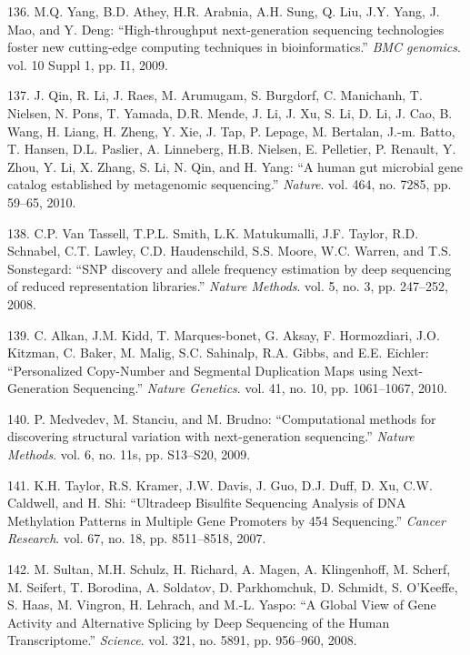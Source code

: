 \documentclass[12pt,a4paper,twoside]{ugathesis}
\theoremstyle{definition}
\theoremstyle{definition}
\theoremstyle{definition}
\theoremstyle{remark}
\begin{document}
\hypertarget{ref-Yang2009}{}
136. M.Q. Yang, B.D. Athey, H.R. Arabnia, A.H. Sung, Q. Liu, J.Y. Yang,
J. Mao, and Y. Deng: ``High-throughput next-generation sequencing
technologies foster new cutting-edge computing techniques in
bioinformatics.'' \emph{BMC genomics}. vol. 10 Suppl 1, pp. I1, 2009.

\hypertarget{ref-Qin2010}{}
137. J. Qin, R. Li, J. Raes, M. Arumugam, S. Burgdorf, C. Manichanh, T.
Nielsen, N. Pons, T. Yamada, D.R. Mende, J. Li, J. Xu, S. Li, D. Li, J.
Cao, B. Wang, H. Liang, H. Zheng, Y. Xie, J. Tap, P. Lepage, M.
Bertalan, J.-m. Batto, T. Hansen, D.L. Paslier, A. Linneberg, H.B.
Nielsen, E. Pelletier, P. Renault, Y. Zhou, Y. Li, X. Zhang, S. Li, N.
Qin, and H. Yang: ``A human gut microbial gene catalog established by
metagenomic sequencing.'' \emph{Nature}. vol. 464, no. 7285, pp. 59--65,
2010.

\hypertarget{ref-VanTassell2008}{}
138. C.P. Van Tassell, T.P.L. Smith, L.K. Matukumalli, J.F. Taylor, R.D.
Schnabel, C.T. Lawley, C.D. Haudenschild, S.S. Moore, W.C. Warren, and
T.S. Sonstegard: ``SNP discovery and allele frequency estimation by deep
sequencing of reduced representation libraries.'' \emph{Nature Methods}.
vol. 5, no. 3, pp. 247--252, 2008.

\hypertarget{ref-Alkan2010}{}
139. C. Alkan, J.M. Kidd, T. Marques-bonet, G. Aksay, F. Hormozdiari,
J.O. Kitzman, C. Baker, M. Malig, S.C. Sahinalp, R.A. Gibbs, and E.E.
Eichler: ``Personalized Copy-Number and Segmental Duplication Maps using
Next-Generation Sequencing.'' \emph{Nature Genetics}. vol. 41, no. 10,
pp. 1061--1067, 2010.

\hypertarget{ref-Medvedev2009}{}
140. P. Medvedev, M. Stanciu, and M. Brudno: ``Computational methods for
discovering structural variation with next-generation sequencing.''
\emph{Nature Methods}. vol. 6, no. 11s, pp. S13--S20, 2009.

\hypertarget{ref-Taylor2007}{}
141. K.H. Taylor, R.S. Kramer, J.W. Davis, J. Guo, D.J. Duff, D. Xu,
C.W. Caldwell, and H. Shi: ``Ultradeep Bisulfite Sequencing Analysis of
DNA Methylation Patterns in Multiple Gene Promoters by 454 Sequencing.''
\emph{Cancer Research}. vol. 67, no. 18, pp. 8511--8518, 2007.

\hypertarget{ref-Sultan2008}{}
142. M. Sultan, M.H. Schulz, H. Richard, A. Magen, A. Klingenhoff, M.
Scherf, M. Seifert, T. Borodina, A. Soldatov, D. Parkhomchuk, D.
Schmidt, S. O'Keeffe, S. Haas, M. Vingron, H. Lehrach, and M.-L. Yaspo:
``A Global View of Gene Activity and Alternative Splicing by Deep
Sequencing of the Human Transcriptome.'' \emph{Science}. vol. 321, no.
5891, pp. 956--960, 2008.
\end{document}
